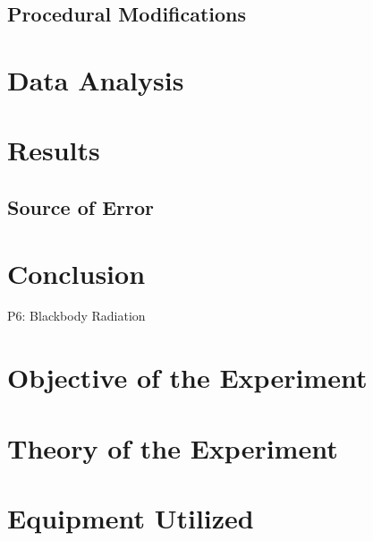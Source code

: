 \documentclass[a4paper]{article}
\begin{document}

\subsection{Procedural Modifications}
\qq 

\section{Data Analysis}


\section{Results}

\subsection{Source of Error}

\section{Conclusion}

\newpage

P6: Blackbody Radiation

\newpage

\section{Objective of the Experiment}
\qq 

\section{Theory of the Experiment}


\section{Equipment Utilized}
\end{document}
